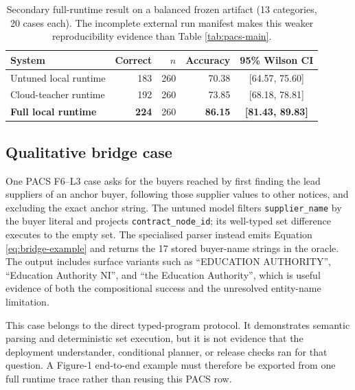 \begin{table}[t]
  \caption{Secondary full-runtime result on a balanced frozen artifact (13 categories,
  20 cases each).  The incomplete external run manifest makes this weaker reproducibility
  evidence than Table \ref{tab:pacs-main}.}
  \label{tab:runtime-main}
  \centering
  \small
  \begin{tabular}{lrrrc}
    \toprule
    System & Correct & $n$ & Accuracy & 95\% Wilson CI \\
    \midrule
    Untuned local runtime & 183 & 260 & 70.38 & [64.57, 75.60] \\
    Cloud-teacher runtime & 192 & 260 & 73.85 & [68.18, 78.81] \\
    \textbf{Full local runtime} & \textbf{224} & 260 & \textbf{86.15} & \textbf{[81.43, 89.83]} \\
    \bottomrule
  \end{tabular}
\end{table}

\subsection{Qualitative bridge case}

One PACS F6--L3 case asks for the buyers reached by first finding the lead suppliers of an anchor
buyer, following those supplier values to other notices, and excluding the exact anchor string.
The untuned model filters \texttt{supplier\_name} by the buyer literal and projects
\texttt{contract\_node\_id}; its well-typed set difference executes to the empty set.  The
specialised parser instead emits Equation \ref{eq:bridge-example} and returns the 17 stored
buyer-name strings in the oracle.  The output includes surface variants such as
``EDUCATION AUTHORITY'', ``Education Authority NI'', and ``the Education Authority'', which is
useful evidence of both the compositional success and the unresolved entity-name limitation.

This case belongs to the direct typed-program protocol.  It demonstrates semantic parsing and
deterministic set execution, but it is not evidence that the deployment understander,
conditional planner, or release checks ran for that question.  A Figure-1 end-to-end example
must therefore be exported from one full runtime trace rather than reusing this PACS row.
